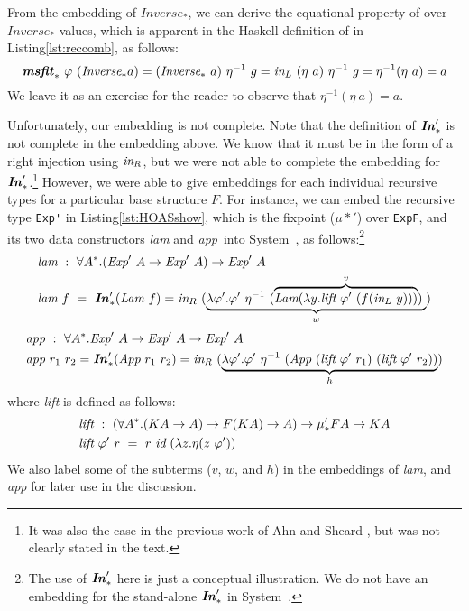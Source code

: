 From the embedding of $\textit{Inverse}_{*}$, we can derive the equational
property of \msfit{*} over $\textit{Inverse}_{*}$-values, which is apparent in
the Haskell definition of \msfit{*} in Listing\;\ref{lst:reccomb}, as follows:
\[
\textbf{\textit{msfit}}_{*}~\varphi~(\textit{Inverse}_{*} a) =
(\textit{Inverse}_{*}~a)~\eta^{-1}~g
= \textit{in}_{L}~(\eta~a)~\eta^{-1}~g = \eta^{-1}(\eta~a) = a
\]
We leave it as an exercise for the reader to observe that
$\eta^{-1}(\eta~a) = a$.

Unfortunately, our embedding is not complete. Note that the definition of
$\textbf{\textit{In}}_{*}'$ is not complete in the embedding above. We know that it must be
in the form of a right injection using $\textit{in}_{R}$, but we were not able to
complete the embedding for $\textbf{\textit{In}}_{*}'$.\footnote{
	It was also the case in the previous work of Ahn and Sheard
	\cite{AhnShe11}, but was not clearly stated in the text.}
However, we were able to give embeddings for each individual recursive types
for a particular base structure $F$. For instance, we can embed
the recursive type \lstinline{Exp'} in Listing\;\ref{lst:HOASshow},
which is the fixpoint ($\mu{*}'$) over \lstinline{ExpF}, and
its two data constructors \textit{lam} and \textit{app}\, into System~\Fw,
as follows:\footnote{The use of $\textbf{\textit{In}}_{*}'$ here is
	just a conceptual illustration. We do not have
	an embedding for the stand-alone $\textbf{\textit{In}}_{*}'$ in System~\Fw.}
\begin{align*}
\textit{lam}&~:~\forall A^{*}.
		(\textit{Exp}'~A \to \textit{Exp}'~A) \to \textit{Exp}'~A \\
\textit{lam}&~f~=~\textbf{\textit{In}}_{*}'(\textit{Lam}~f)
= \textit{in}_{R}~(\underbrace{
	\lambda \varphi'.\varphi'~\eta^{-1}~
	(\overbrace{\textit{Lam}(\lambda y.\textit{lift}~\varphi'~(f(\textit{in}_{L}~y))) }^v)\;
	}_w)
\end{align*}
\vspace*{-4ex}
\begin{align*}
\textit{app}&~:~\forall A^{*}.
		\textit{Exp}'~A \to \textit{Exp}'~A \to \textit{Exp}'~A \\
\textit{app}&~r_1~r_2 = \textbf{\textit{In}}_{*}'(\textit{App}~r_1~r_2)
= \textit{in}_{R}~(\underbrace{
		\lambda \varphi'.\varphi'~\eta^{-1}~
		(\textit{App}~(\textit{lift}~\varphi'~r_1)~(\textit{lift}~\varphi'~r_2))}_h)
\end{align*}
where \textit{lift} is defined as follows:
\begin{align*}
& \textit{lift}~:~(\forall A^{*}.(K A\to A)\to F(K A)\to A)\to \mu_{*}' F A\to K A\\
& \textit{lift}~\varphi'~r ~=~ r~\textit{id}~(\lambda z.\eta(z~\varphi'))
\end{align*}
We also label some of the subterms ($v$, $w$, and $h$)
in the embeddings of \textit{lam}, and \textit{app} for
later use in the discussion.

